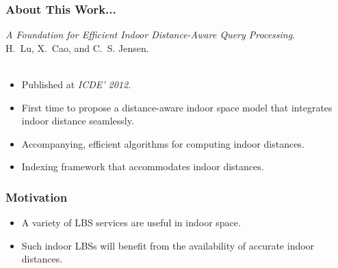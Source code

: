 \begin{frame}
\frametitle{About This Work...}

\emph{A Foundation for Efficient Indoor Distance-Aware Query Processing}.~\cite{DBLP:conf/icde/LuYCJ11} \\
H.~Lu, X.~Cao, and C.~S. Jensen.\\~\\

\begin{itemize}
  \item Published at \emph{ICDE' 2012}.
  \item First time to propose a distance-aware indoor space model that integrates indoor distance seamlessly.
  \item Accompanying, efficient algorithms for computing indoor distances.
  \item Indexing framework that accommodates indoor distances.
\end{itemize}

\end{frame}


\begin{frame}
\frametitle{Motivation}

\begin{itemize}
  \item A variety of LBS services are useful in indoor space.

  \item Such indoor LBSs will benefit from the availability of accurate indoor distances.

\end{itemize}

\end{frame}

